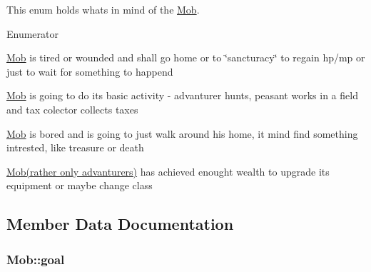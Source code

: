 This enum holds what\textquotesingle{}s in mind of the \hyperlink{class_mob}{Mob}. \begin{Desc}
\item[Enumerator]\par
\begin{description}
\item[{\em 
rest\hypertarget{class_mob_a886346a9f913203df0797f2c84dd8962a3d18c0a90658cc4872eed0afe28790b4}{}\label{class_mob_a886346a9f913203df0797f2c84dd8962a3d18c0a90658cc4872eed0afe28790b4}
}]\hyperlink{class_mob}{Mob} is tired or wounded and shall go home or to \char`\"{}sancturacy\char`\"{} to regain hp/mp or just to wait for something to happend \item[{\em 
grind\hypertarget{class_mob_a886346a9f913203df0797f2c84dd8962aa72b321b37507255070e236e133616f9}{}\label{class_mob_a886346a9f913203df0797f2c84dd8962aa72b321b37507255070e236e133616f9}
}]\hyperlink{class_mob}{Mob} is going to do it\textquotesingle{}s basic activity -\/ advanturer hunts, peasant works in a field and tax colector collects taxes \item[{\em 
explore\hypertarget{class_mob_a886346a9f913203df0797f2c84dd8962a114d85e85d882dd8bf2be34208450b6c}{}\label{class_mob_a886346a9f913203df0797f2c84dd8962a114d85e85d882dd8bf2be34208450b6c}
}]\hyperlink{class_mob}{Mob} is bored and is going to just walk around his home, it mind find something intrested, like treasure or death \item[{\em 
upgrade\hypertarget{class_mob_a886346a9f913203df0797f2c84dd8962ac9be3f62a039d2a4c5a63146a03a307d}{}\label{class_mob_a886346a9f913203df0797f2c84dd8962ac9be3f62a039d2a4c5a63146a03a307d}
}]\hyperlink{class_mob}{Mob(rather only advanturers)} has achieved enought wealth to upgrade it\textquotesingle{}s equipment or maybe change class \end{description}
\end{Desc}


\subsection{Member Data Documentation}
\subsubsection[{\texorpdfstring{goal}{goal}}]{ Mob\+::goal\hspace{0.3cm}{\ttfamily [protected]}}\hypertarget{class_mob_ad6c2e1b70a39551fd39b25002dac55b1}{}\label{class_mob_ad6c2e1b70a39551fd39b25002dac55b1}


